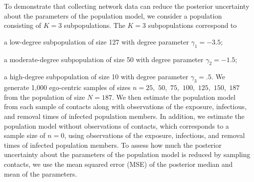 To demonstrate that collecting network data can reduce the posterior uncertainty about the parameters of the population model,
we consider a population consisting of $K=3$ subpopulations.
The $K=3$ subpopulations correspond to 
\bi
\item a low-degree subpopulation of size 127 with degree parameter $\gamma_1 = -3.5$;
\item a moderate-degree subpopulation of size 50 with degree parameter $\gamma_2 = -1.5$;
\item a high-degree subpopulation of size 10 with degree parameter $\gamma_3 = .5$.
\ei
We generate 1,000 ego-centric samples of sizes $n = 25$,\, $50$,\, $75$,\, $100$,\, $125$,\, $150$,\, $187$ from the population of size $N = 187$.
We then estimate the population model from each sample of contacts along with observations of the exposure, infectious, and removal times of infected population members.
In addition,
we estimate the population model without observations of contacts,
which corresponds to a sample size of $n=0$,
using observations of the exposure, infectious, and removal times of infected population members.
To assess how much the posterior uncertainty about the parameters of the population model is reduced by sampling contacts,
we use the mean squared error (MSE) of the posterior median and mean of the parameters.
